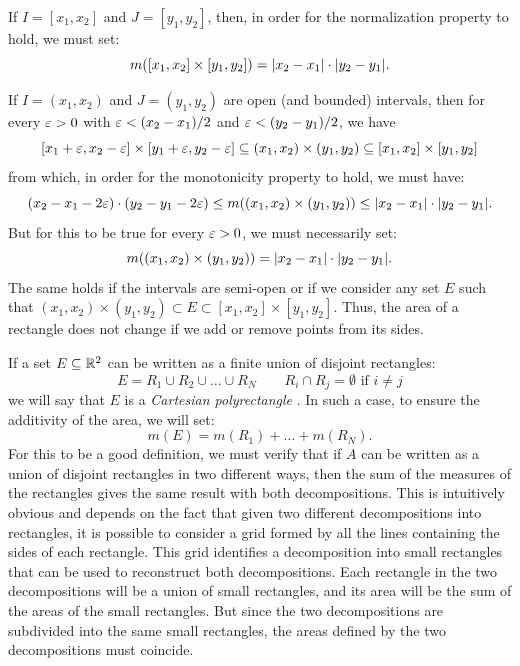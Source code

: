 If $I=[x_1,x_2]$ and $J=[y_1,y_2]$, then, in order for the normalization
property to hold, we must set:
\[
  m([x_1,x_2]\times[y_1,y_2]) = {\left|x_2-x_1\right|}\cdot{\left|y_2-y_1\right|}.
\]

If $I=(x_1,x_2)$ and $J=(y_1,y_2)$ are open (and bounded) intervals, then for
every $\varepsilon>0$ with $\varepsilon<(x_2-x_1)/2$ and $\varepsilon<(y_2-y_1)/2$, we have
\[
  [x_1+\varepsilon,x_2-\varepsilon] \times [y_1+\varepsilon,y_2-\varepsilon]
  \subseteq (x_1,x_2)\times (y_1,y_2)
  \subseteq [x_1,x_2]\times [y_1,y_2]
\]
from which, in order for the monotonicity property to hold, we must have:
\[
    (x_2-x_1-2\varepsilon)\cdot (y_2-y_1-2\varepsilon) \le m((x_1,x_2)\times(y_1,y_2)) \le
  {\left|x_2-x_1\right|}\cdot {\left|y_2-y_1\right|}.
\]
But for this to be true for every $\varepsilon>0$, we must necessarily set:
\[
  m((x_1,x_2)\times(y_1,y_2)) = {\left|x_2-x_1\right|}\cdot{\left|y_2-y_1\right|}.
\]
The same holds if the intervals are semi-open or if we consider any set $E$ such
that $(x_1,x_2)\times (y_1,y_2) \subset E \subset [x_1,x_2]\times[y_1,y_2]$.
Thus, the area of a rectangle does not change if we add or remove points from
its sides.

If a set $E\subseteq {\mathbb R}^2$ can be written as a finite union of disjoint
rectangles:
\[
  E = R_1 \cup R_2 \cup \dots \cup R_N
  \qquad
  R_i \cap R_j=\emptyset\text{ if } i\neq j
\]
we will say that $E$ is a \emph{Cartesian polyrectangle}%
%
.
In such a case, to ensure the additivity of the area, we will set:
\[
  m(E) = m(R_1) + \dots + m(R_N).
\]
For this to be a good definition, we must verify that if $A$ can be written as a
union of disjoint rectangles in two different ways, then the sum of the measures
of the rectangles gives the same result with both decompositions. This is
intuitively obvious and depends on the fact that given two different
decompositions into rectangles, it is possible to consider a grid formed by all
the lines containing the sides of each rectangle. This grid identifies a
decomposition into small rectangles that can be used to reconstruct both
decompositions. Each rectangle in the two decompositions will be a union of
small rectangles, and its area will be the sum of the areas of the small
rectangles. But since the two decompositions are subdivided into the same small
rectangles, the areas defined by the two decompositions must coincide.

